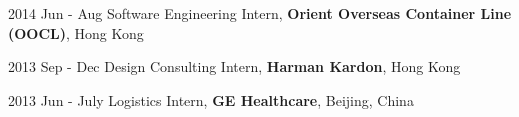 2014 Jun - Aug \hspace{10mm} 
Software Engineering Intern, \textbf{Orient Overseas Container Line (OOCL)}, Hong Kong

2013 Sep - Dec \hspace{9mm} 
Design Consulting Intern, \textbf{Harman Kardon}, Hong Kong

2013 Jun - July \hspace{10mm} 
Logistics Intern, \textbf{GE Healthcare}, Beijing, China
